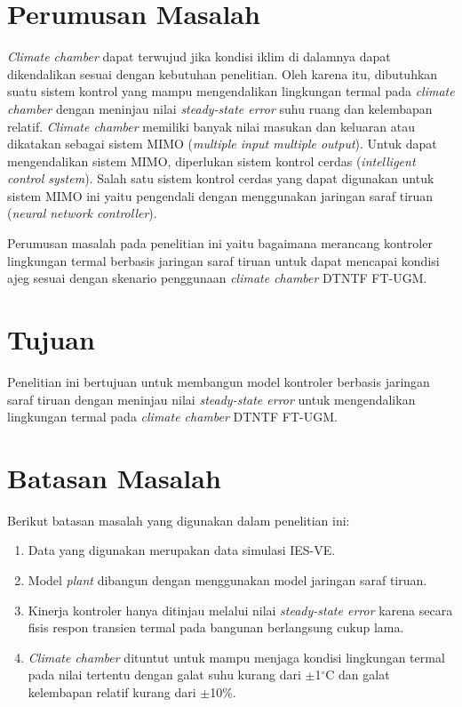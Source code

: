 \section{Perumusan Masalah}
\textit{Climate chamber} dapat terwujud jika kondisi iklim di dalamnya dapat dikendalikan sesuai dengan kebutuhan penelitian. Oleh karena itu, dibutuhkan suatu sistem kontrol yang mampu mengendalikan lingkungan termal pada \textit{climate chamber} dengan meninjau nilai \textit{steady-state error} suhu ruang dan kelembapan relatif. \textit{Climate chamber} memiliki banyak nilai masukan dan keluaran atau dikatakan sebagai sistem MIMO (\textit{multiple input multiple output}). Untuk dapat mengendalikan sistem MIMO, diperlukan sistem kontrol cerdas (\textit{intelligent control system}). Salah satu sistem kontrol cerdas yang dapat digunakan untuk sistem MIMO ini yaitu pengendali dengan menggunakan jaringan saraf tiruan (\textit{neural network controller}).

Perumusan masalah pada penelitian ini yaitu bagaimana merancang kontroler lingkungan termal berbasis jaringan saraf tiruan untuk dapat mencapai kondisi ajeg sesuai dengan skenario penggunaan \textit{climate chamber} DTNTF FT-UGM.

\section{Tujuan}
Penelitian ini bertujuan untuk membangun model kontroler berbasis jaringan saraf tiruan dengan meninjau nilai \textit{steady-state error} untuk mengendalikan lingkungan termal pada \textit{climate chamber} DTNTF FT-UGM.

\section{Batasan Masalah}
Berikut batasan masalah yang digunakan dalam penelitian ini:
\begin{enumerate}
	\item Data yang digunakan merupakan data simulasi IES-VE.
	\item Model \textit{plant} dibangun dengan menggunakan model jaringan saraf tiruan.
	\item Kinerja kontroler hanya ditinjau melalui nilai \textit{steady-state error} karena secara fisis respon transien termal pada bangunan berlangsung cukup lama.
	\item \textit{Climate chamber} dituntut untuk mampu menjaga kondisi lingkungan termal pada nilai tertentu dengan galat suhu kurang dari $\pm$1$^{\circ}$C dan galat kelembapan relatif kurang dari $\pm$10\%.
\end{enumerate}

